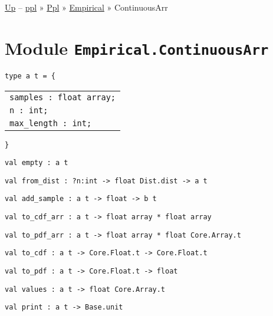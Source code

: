 \href{../index.html}{Up} -- \href{../../../index.html}{ppl} »
\href{../../index.html}{Ppl} » \href{../index.html}{Empirical} »
ContinuousArr

\section{\texorpdfstring{Module
\texttt{Empirical.ContinuousArr}}{Module Empirical.ContinuousArr}}\label{module-empirical.continuousarr}

\protect\hyperlink{type-t}{}\texttt{type\ \textquotesingle{}a\ t}\texttt{\ =\ }\texttt{\{}

\begin{longtable}[c]{@{}l@{}}
\toprule
\protect\hyperlink{type-t.samples}{}\texttt{samples\ :\ float\ array;}\tabularnewline
\protect\hyperlink{type-t.n}{}\texttt{n\ :\ int;}\tabularnewline
\protect\hyperlink{type-t.maxux5flength}{}\texttt{max\_length\ :\ int;}\tabularnewline
\bottomrule
\end{longtable}

\texttt{\}}

\protect\hyperlink{val-empty}{}\texttt{val\ empty\ :\ \textquotesingle{}a\ t}

\protect\hyperlink{val-fromux5fdist}{}\texttt{val\ from\_dist\ :\ ?⁠n:int\ -\textgreater{}\ float\ Dist.dist\ -\textgreater{}\ \textquotesingle{}a\ t}

\protect\hyperlink{val-addux5fsample}{}\texttt{val\ add\_sample\ :\ \textquotesingle{}a\ t\ -\textgreater{}\ float\ -\textgreater{}\ \textquotesingle{}b\ t}

\protect\hyperlink{val-toux5fcdfux5farr}{}\texttt{val\ to\_cdf\_arr\ :\ \textquotesingle{}a\ t\ -\textgreater{}\ float\ array\ *\ float\ array}

\protect\hyperlink{val-toux5fpdfux5farr}{}\texttt{val\ to\_pdf\_arr\ :\ \textquotesingle{}a\ t\ -\textgreater{}\ float\ array\ *\ float\ Core.Array.t}

\protect\hyperlink{val-toux5fcdf}{}\texttt{val\ to\_cdf\ :\ \textquotesingle{}a\ t\ -\textgreater{}\ Core.Float.t\ -\textgreater{}\ Core.Float.t}

\protect\hyperlink{val-toux5fpdf}{}\texttt{val\ to\_pdf\ :\ \textquotesingle{}a\ t\ -\textgreater{}\ Core.Float.t\ -\textgreater{}\ float}

\protect\hyperlink{val-values}{}\texttt{val\ values\ :\ \textquotesingle{}a\ t\ -\textgreater{}\ float\ Core.Array.t}

\protect\hyperlink{val-print}{}\texttt{val\ print\ :\ \textquotesingle{}a\ t\ -\textgreater{}\ Base.unit}


